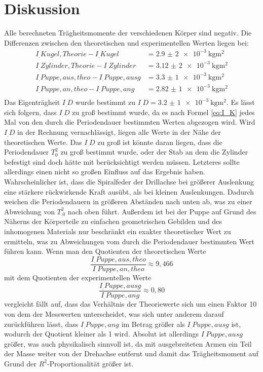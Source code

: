 \section{Diskussion}
\label{sec:Diskussion}
Alle berechneten Trägheitsmomente der verschiedenen Körper sind negativ.
Die Differenzen zwischen den theoretischen und experimentellen Werten liegen bei:
\begin{align*}
I_.{Kugel,Theorie}-I_.{Kugel}		&=\SI{2,9(2)e-3}{\kilo\gram\metre\squared}\\
I_.{Zylinder,Theorie}-I_.{Zylinder}	&=\SI{3,12(2)e-3}{\kilo\gram\metre\squared}\\
I_.{Puppe,aus,theo}-I_.{Puppe,ausg}	&=\SI{3,3(1)e-3}{\kilo\gram\metre\squared}\\
I_.{Puppe,an,theo}-I_.{Puppe,ang}	&=\SI{2,82(1)e-3}{\kilo\gram\metre\squared}\\
\end{align*}
Das Eigenträgheit $I_.D$ wurde bestimmt zu $I_.D=\SI{3,2(1)e-3}{\kilo\gram\metre\squared}$.
Es lässt sich folgern, dass $I_.D$ zu groß bestimmt wurde, da es nach Formel \eqref{eq:I_K} jedes Mal von den durch die Periodendauer bestimmten Werten abgezogen wird. Wird $I_.D$ in der Rechnung vernachlässigt, liegen alle Werte in der Nähe der theoretischen Werte.\newline
Das $I_.D$ zu groß ist könnte daran liegen, dass die Periodendauer $T_0^2$ zu groß bestimmt wurde, oder der Stab an dem die Zylinder befestigt sind doch hätte mit berücksichtigt werden müssen. Letzteres sollte allerdings einen nicht so großen Einfluss auf das Ergebnis haben. Wahrscheinlicher ist, dass die Spiralfeder der Drillachse bei größerer Auslenkung eine stärkere rückwirkende Kraft ausübt, als bei kleinen Auslenkungen. Dadurch weichen die Periodendauern in größeren Abständen nach unten ab, was zu einer Abweichung von $T_.0^2$ nach oben führt.\newline
Außerdem ist bei der Puppe auf Grund des Näherns der Körperteile zu einfachen geometrischen Gebilden und des inhomogenen Materials nur beschränkt ein exakter theoretischer Wert zu ermitteln, was zu Abweichungen vom durch die Periodendauer bestimmten Wert führen kann.
Wenn man den Quotienten der theoretischen Werte \[\frac{I_.{Puppe,aus,theo}}{I_.{Puppe,an,theo}}\approx 9,466\]
mit dem Quotienten der experimentellen Werte \[\frac{I_.{Puppe,ausg}}{I_.{Puppe,ang}}\approx 0,80\]
vergleicht fällt auf, dass das Verhältnis der Theoriewerte sich um einen Faktor 10 von dem der Messwerten unterscheidet, was sich unter anderem darauf zurückführen lässt, dass $I_.{Puppe,ang}$ im Betrag größer als $I_.{Puppe,ausg}$ ist, wodurch der Quotient kleiner als 1 wird. Absolut ist allerdings $I_.{Puppe,ausg}$ größer, was auch physikalisch sinnvoll ist, da mit ausgebreiteten Armen ein Teil der Masse weiter von der Drehachse entfernt und damit das Trägheitsmoment auf Grund der $R^2$-Proportionalität größer ist.